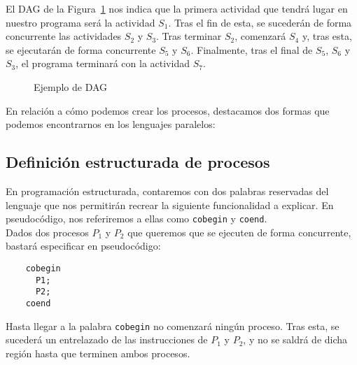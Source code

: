 \begin{ejemplo}
    El DAG de la Figura~\ref{fig:primer_dag} nos indica que la primera actividad que tendrá lugar en nuestro programa será la actividad $S_1$. Tras el fin de esta, se sucederán de forma concurrente las actividades $S_2$ y $S_3$. Tras terminar $S_2$, comenzará $S_4$ y, tras esta, se ejecutarán de forma concurrente $S_5$ y $S_6$. Finalmente, tras el final de $S_5$, $S_6$ y $S_3$, el programa terminará con la actividad $S_7$.

    \begin{figure}[H]
    \centering
    \caption{Ejemplo de DAG}
    \label{fig:primer_dag}
    \end{figure}
\end{ejemplo}

\noindent
En relación a cómo podemos crear los procesos, destacamos dos formas que podemos encontrarnos en los lenguajes paralelos:

\subsection{Definición estructurada de procesos}
En programación estructurada, contaremos con dos palabras reservadas del lenguaje que nos permitirán recrear la siguiente funcionalidad a explicar. En pseudocódigo, nos referiremos a ellas como \verb|cobegin| y \verb|coend|.\\

Dados dos procesos $P_1$ y $P_2$ que queremos que se ejecuten de forma concurrente, bastará especificar en pseudocódigo:
\begin{verbatim}
    cobegin
      P1; 
      P2; 
    coend
\end{verbatim}
Hasta llegar a la palabra \verb|cobegin| no comenzará ningún proceso. Tras esta, se sucederá un entrelazado de las instrucciones de $P_1$ y $P_2$, y no se saldrá de dicha región hasta que terminen ambos procesos.

